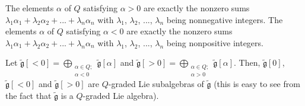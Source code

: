 \documentclass[etingof-lie.tex]{subfiles}
\begin{document}
The elements $\alpha$ of $Q$ satisfying $\alpha>0$ are exactly the nonzero
sums $\lambda_{1}\alpha_{1}+\lambda_{2}\alpha_{2}+...+\lambda_{n}\alpha_{n}$
with $\lambda_{1}$, $\lambda_{2}$, $...$, $\lambda_{n}$ being nonnegative
integers. The elements $\alpha$ of $Q$ satisfying $\alpha<0$ are exactly the
nonzero sums $\lambda_{1}\alpha_{1}+\lambda_{2}\alpha_{2}+...+\lambda
_{n}\alpha_{n}$ with $\lambda_{1}$, $\lambda_{2}$, $...$, $\lambda_{n}$ being
nonpositive integers.

Let $\widetilde{\mathfrak{g}}\left[  <0\right]  =\bigoplus
\limits_{\substack{\alpha\in Q;\\\alpha<0}}\widetilde{\mathfrak{g}}\left[
\alpha\right]  $ and $\widetilde{\mathfrak{g}}\left[  >0\right]
=\bigoplus\limits_{\substack{\alpha\in Q;\\\alpha>0}}\widetilde{\mathfrak{g}%
}\left[  \alpha\right]  $. Then, $\widetilde{\mathfrak{g}}\left[  0\right]  $,
$\widetilde{\mathfrak{g}}\left[  <0\right]  $ and $\widetilde{\mathfrak{g}%
}\left[  >0\right]  $ are $Q$-graded Lie subalgebras of
$\widetilde{\mathfrak{g}}$ (this is easy to see from the fact that
$\widetilde{\mathfrak{g}}$ is a $Q$-graded Lie algebra).
\end{document}
